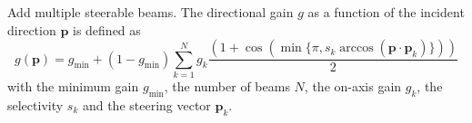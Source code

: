 Add multiple steerable beams. The directional gain $g$ as a function
of the incident direction $\mathbf{p}$ is defined as
%
\begin{equation}
g(\mathbf{p}) = g_{\textrm{min}} + (1-g_{\textrm{min}})\sum\limits_{k=1}^N g_k\frac{\left(1+\cos\left(\min\{\pi,s_k \arccos\left(\mathbf{p}\cdot\mathbf{p}_k\right)\}\right)\right)}{2}
\end{equation}
%
with the minimum gain $g_\textrm{min}$, the number of beams $N$, the
on-axis gain $g_k$, the selectivity $s_k$ and the steering vector
$\mathbf{p}_k$.


